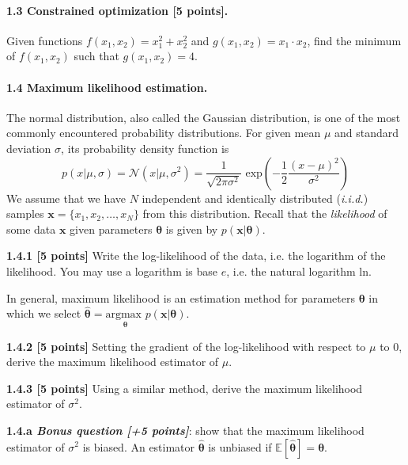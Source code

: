 \documentclass{article}
\begin{document}
\paragraph{1.3 Constrained optimization [5 points].} Given functions
$f(x_1, x_2) = x_1^2 + x_2^2$ and $g(x_1, x_2) = x_1 \cdot x_2$, find the minimum of $f(x_1, x_2)$ such that $g(x_1, x_2) = 4$.

\paragraph{1.4 Maximum likelihood estimation.} The normal distribution, also called the Gaussian distribution, is one of the most commonly encountered probability distributions. For given mean $\mu$ and standard deviation $\sigma$, its probability density function is
\begin{equation} \label{eq:normal_distribution}
p(x|\mu, \sigma) = \mathcal{N}(x|\mu, \sigma^2) = \frac{1}{\sqrt{2\pi\sigma^2}} \text{ exp} \left( -\frac{1}{2} \frac{(x-\mu)^2}{\sigma^2}\right)
\end{equation}
We assume that we have $N$ independent and identically distributed (\textit{i.i.d.}) samples $\mathbf{x} = \{x_1, x_2, \dots, x_N\}$ from this distribution. Recall that the \textit{likelihood} of some data $\mathbf{x}$ given parameters $\boldsymbol{\theta}$ is given by $p(\mathbf{x}|\boldsymbol{\theta})$.

\noindent\textbf{1.4.1 [5 points]} Write the log-likelihood of the data, i.e. the logarithm of the likelihood.  You may use a logarithm is base $e$, i.e. the natural logarithm $\text{ln}$.

In general, maximum likelihood is an estimation method for parameters $\boldsymbol{\theta}$ in which we select
$\hat{\boldsymbol{\theta}} = \underset{\boldsymbol{\theta}}{\text{argmax }} p(\mathbf{x}|\boldsymbol{\theta})$.

\noindent\textbf{1.4.2 [5 points]} Setting the gradient of the log-likelihood with respect to $\mu$ to $0$, derive the maximum likelihood estimator of $\mu$.

\noindent\textbf{1.4.3 [5 points]} Using a similar method, derive the maximum likelihood estimator of $\sigma^2$.

\noindent\textbf{1.4.a \textit{Bonus question [+5 points]}}: show that the maximum likelihood estimator of $\sigma^2$ is biased. An estimator $\hat{\boldsymbol{\theta}}$ is unbiased if $\mathbb{E}[\hat{\boldsymbol{\theta}}] = \boldsymbol{\theta}$.
\end{document}
